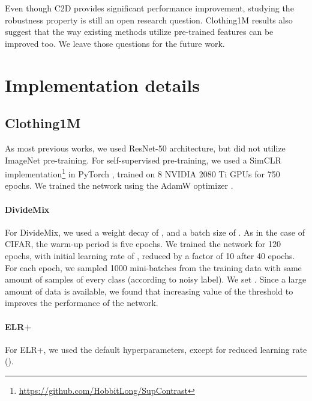 \documentclass[10pt,twocolumn,letterpaper]{article}
\renewcommand{\cite}[1]{\citep{#1}}
\begin{document}
Even though C2D provides significant performance improvement, studying the robustness property is still an open research question.  Clothing1M results also suggest that the way existing methods utilize pre-trained features can be improved too. We leave those questions for the future work.

 
{\small


}


\appendix{}

\renewcommand\thefigure{\thesection.\arabic{figure}} 
\renewcommand\thetable{\thesection.\arabic{table}} 
\renewcommand\theequation{\thesection.\arabic{equation}}  
\setcounter{figure}{0}  
\setcounter{table}{0}


\section{Implementation details}
\subsection{Clothing1M}

As most previous works, we used ResNet-50 architecture, but did not utilize ImageNet pre-training.
For self-supervised pre-training, we used a SimCLR implementation\footnote{\url{https://github.com/HobbitLong/SupContrast}} in PyTorch \cite{paszke2019pytorch}, trained on 8 NVIDIA 2080 Ti GPUs for 750 epochs. We trained the network using the AdamW optimizer \cite{loshchilov2017decoupled}.

\paragraph{DivideMix}
For DivideMix, we used a weight decay of , and a batch size of . As in the case of CIFAR, the warm-up period is five epochs. We trained the network for 120 epochs, with initial learning rate of , reduced by a factor of 10 after 40 epochs. For each epoch, we sampled 1000 mini-batches from the training data with same amount of samples of every class (according to noisy label). 
We set . Since a large amount of data is available, we found that increasing value of the threshold to  improves the performance of the network.

\paragraph{ELR+}
For ELR+, we used the default hyperparameters, except for reduced learning rate ().
\end{document}
